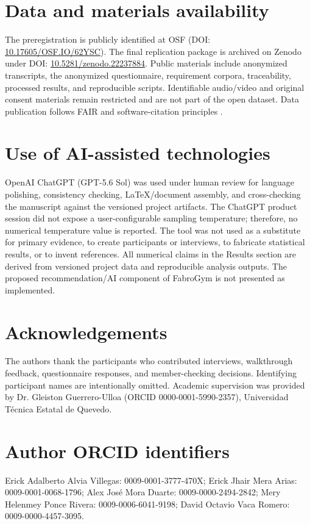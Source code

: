\documentclass[pdflatex,sn-basic]{sn-jnl}
\begin{document}
\section*{Data and materials availability}
The preregistration is publicly identified at OSF (DOI: \href{https://doi.org/10.17605/OSF.IO/62YSC}{10.17605/OSF.IO/62YSC}). The final replication package is archived on Zenodo under DOI: \href{https://doi.org/10.5281/zenodo.22237884}{10.5281/zenodo.22237884}. Public materials include anonymized transcripts, the anonymized questionnaire, requirement corpora, traceability, processed results, and reproducible scripts. Identifiable audio/video and original consent materials remain restricted and are not part of the open dataset. Data publication follows FAIR and software-citation principles \cite{wilkinson2016,smith2016,dicosmo2020}.

\section*{Use of AI-assisted technologies}
OpenAI ChatGPT (GPT-5.6 Sol) was used under human review for language polishing, consistency checking, LaTeX/document assembly, and cross-checking the manuscript against the versioned project artifacts. The ChatGPT product session did not expose a user-configurable sampling temperature; therefore, no numerical temperature value is reported. The tool was not used as a substitute for primary evidence, to create participants or interviews, to fabricate statistical results, or to invent references. All numerical claims in the Results section are derived from versioned project data and reproducible analysis outputs. The proposed recommendation/AI component of FabroGym is not presented as implemented.

\section*{Acknowledgements}
The authors thank the participants who contributed interviews, walkthrough feedback, questionnaire responses, and member-checking decisions. Identifying participant names are intentionally omitted. Academic supervision was provided by Dr. Gleiston Guerrero-Ulloa (ORCID 0000-0001-5990-2357), Universidad T{\'e}cnica Estatal de Quevedo.

\section*{Author ORCID identifiers}
Erick Adalberto Alvia Villegas: 0009-0001-3777-470X; Erick Jhair Mera Arias: 0009-0001-0068-1796; Alex Jos{\'e} Mora Duarte: 0009-0000-2494-2842; Mery Helenmey Ponce Rivera: 0009-0006-6041-9198; David Octavio Vaca Romero: 0009-0000-4457-3095.
\end{document}
